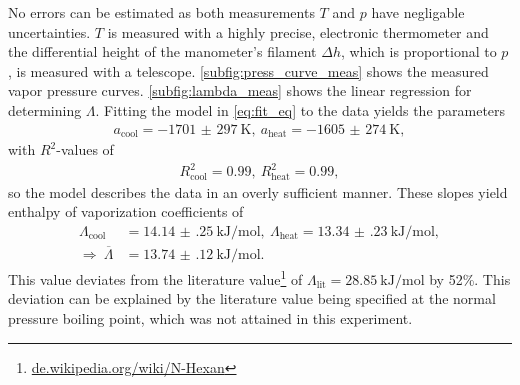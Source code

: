 No errors can be estimated as both measurements $T$ and $p$ have negligable uncertainties.
$T$ is measured with a highly precise, electronic thermometer and the differential height of the manometer's filament $\Delta h$, which is proportional to $p$, is measured with a telescope.
\autoref{subfig:press_curve_meas} shows the measured vapor pressure curves.
\autoref{subfig:lambda_meas} shows the linear regression for determining $\Lambda$.
Fitting the model in \autoref{eq:fit_eq} to the data yields the parameters
\begin{align*}
	a_\text{cool}=\SI{-1701(297)}{\kelvin},\ a_\text{heat}=\SI{-1605(274)}{\kelvin},
\end{align*}
with $R^2$-values of
\begin{align*}
	R^2_\text{cool}=\num{0.99},\ R^2_\text{heat}=\num{0.99},
\end{align*}
so the model describes the data in an overly sufficient manner.
These slopes yield enthalpy of vaporization coefficients of
\begin{align*}
	\Lambda_\text{cool}&=\SI{14.14(25)}{\kilo\joule\per\mole},\ \Lambda_\text{heat}=\SI{13.34(23)}{\kilo\joule\per\mole}, \\
	\Rightarrow\ \overline{\Lambda}&=\SI{13.74(12)}{\kilo\joule\per\mole}.
\end{align*}
This value deviates from the literature value\footnote{\url{de.wikipedia.org/wiki/N-Hexan}} of $\Lambda_\text{lit}=\SI{28.85}{\kilo\joule\per\mole}$ by \num{52}\%.
This deviation can be explained by the literature value being specified at the normal pressure boiling point, which was not attained in this experiment.
